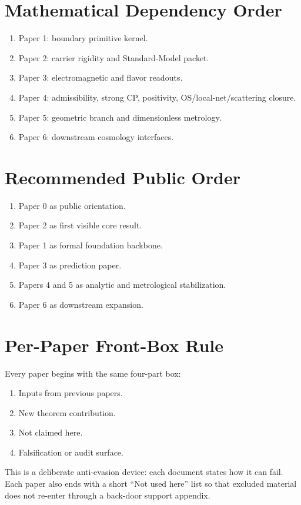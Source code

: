 \documentclass[11pt,a4paper]{article}
\begin{document}
\section{Mathematical Dependency Order}

\begin{enumerate}[leftmargin=1.5em]
    \item Paper 1: boundary primitive kernel.
    \item Paper 2: carrier rigidity and Standard-Model packet.
    \item Paper 3: electromagnetic and flavor readouts.
    \item Paper 4: admissibility, strong CP, positivity, OS/local-net/scattering closure.
    \item Paper 5: geometric branch and dimensionless metrology.
    \item Paper 6: downstream cosmology interfaces.
\end{enumerate}

\section{Recommended Public Order}

\begin{enumerate}[leftmargin=1.5em]
    \item Paper 0 as public orientation.
    \item Paper 2 as first visible core result.
    \item Paper 1 as formal foundation backbone.
    \item Paper 3 as prediction paper.
    \item Papers 4 and 5 as analytic and metrological stabilization.
    \item Paper 6 as downstream expansion.
\end{enumerate}

\section{Per-Paper Front-Box Rule}

Every paper begins with the same four-part box:
\begin{enumerate}[leftmargin=1.5em]
    \item Inputs from previous papers.
    \item New theorem contribution.
    \item Not claimed here.
    \item Falsification or audit surface.
\end{enumerate}
This is a deliberate anti-evasion device: each document states how it can fail. Each paper also
ends with a short ``Not used here'' list so that excluded material does not re-enter through a
back-door support appendix.
\end{document}

